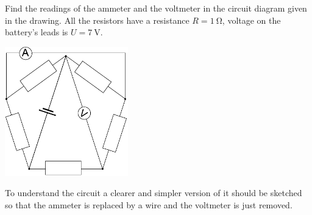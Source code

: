 Find the readings of the ammeter and the voltmeter in the circuit diagram given in the drawing. All the resistors have a resistance $R=\SI{1}{\ohm}$, voltage on the battery’s leads is $U=\SI{7}{\volt}$. 
\begin{center}
	\includegraphics[width=0.4\textwidth]{2017-v3g-06-viisnurk}
\end{center}

\hinteng
To understand the circuit a clearer and simpler version of it should be sketched so that the ammeter is replaced by a wire and the voltmeter is just removed.

